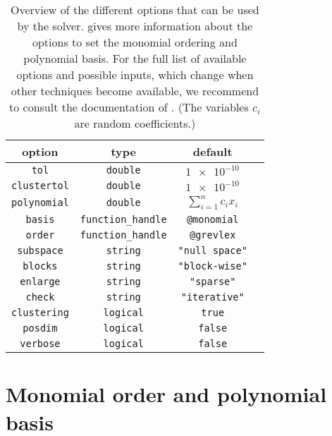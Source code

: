 \documentclass{manual}
\begin{document}
            \begin{table}
                \centering
                \caption{Overview of the different options that can be used by the \maclab\space solver.  gives more information about the options to set the monomial ordering and polynomial basis. For the full list of available options and possible inputs, which change when other techniques become available, we recommend to consult the documentation of . (The variables $c_i$ are random coefficients.)}
                \label{tab:manual:options}
                \begin{tabular}{cccc}
                    \toprule 
                    \textbf{option} & \textbf{type} & \textbf{default} \\ 
                    \midrule
                    \texttt{tol} & \texttt{double} & $\num{1e-10}$ \\
                    \texttt{clustertol} & \texttt{double} & $\num{1e-10}$ \\
                    \texttt{polynomial} & \texttt{double} & $\sum_{i = 1}^n c_i x_i$ \\
                    \texttt{basis} & \texttt{function\_handle} & \texttt{@monomial} \\
                    \texttt{order} & \texttt{function\_handle} & \texttt{@grevlex} \\
                    \texttt{subspace} & \texttt{string} & \texttt{\textcolor{string}{"null space"}} \\
                    \texttt{blocks} & \texttt{string} & \texttt{\textcolor{string}{"block-wise"}} \\
                    \texttt{enlarge} & \texttt{string} & \texttt{\textcolor{string}{"sparse"}} \\
                    \texttt{check} & \texttt{string} & \texttt{\textcolor{string}{"iterative"}} \\
                    \texttt{clustering} & \texttt{logical} & \texttt{true} \\
                    \texttt{posdim} & \texttt{logical} & \texttt{false} \\
                    \texttt{verbose} & \texttt{logical} & \texttt{false} \\
                    \bottomrule
                \end{tabular}
            \end{table}

    \section{Monomial order and polynomial basis}
        \label{sec:manual:monomialordering-polynomialbasis}
\end{document}
